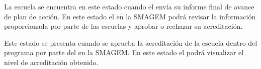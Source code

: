 \begin{description}
       La escuela se encuentra en este estado cuando el  envía su informe final de avance de plan de acción. En este estado el  en la SMAGEM podrá revisar la información proporcionada por parte de las escuelas y aprobar o rechazar su acreditación.
 
       Este estado se presenta cuando se aprueba la acreditación de la escuela dentro del programa por parte del  en la SMAGEM. En este estado el  podrá visualizar el nivel de acreditación obtenido.

\end{description}
